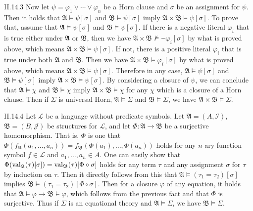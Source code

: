 \documentclass[12pt]{article}
\begin{document}
\begin{customthm}{II.14.3}
  Now let $\psi=\varphi_1\vee\cdots\vee\varphi_n$ be a Horn clause and $\sigma$ be an assignment for $\psi$. Then it holds that $\mathfrak{A}\models\psi[\sigma]$ and $\mathfrak{B}\models\psi[\sigma]$ imply $\mathfrak{A}\times\mathfrak{B}\models\psi[\sigma]$. To prove that, assume that $\mathfrak{A}\models\psi[\sigma]$ and $\mathfrak{B}\models\psi[\sigma]$. If there is a negative literal $\varphi_i$ that is true either under $\mathfrak{A}$ or $\mathfrak{B}$, then we have $\mathfrak{A}\times\mathfrak{B}\not\models\neg\varphi_i[\sigma]$ by what is proved above, which means $\mathfrak{A}\times\mathfrak{B}\models\psi[\sigma]$. If not, there is a positive literal $\varphi_i$ that is true under both $\mathfrak{A}$ and $\mathfrak{B}$. Then we have $\mathfrak{A}\times\mathfrak{B}\models\varphi_i[\sigma]$ by what is proved above, which means $\mathfrak{A}\times\mathfrak{B}\models\psi[\sigma]$. Therefore in any case, $\mathfrak{A}\models\psi[\sigma]$ and $\mathfrak{B}\models\psi[\sigma]$ imply $\mathfrak{A}\times\mathfrak{B}\models\psi[\sigma]$. By considering a closure of $\psi$, we can conclude that $\mathfrak{A}\models\chi$ and $\mathfrak{B}\models\chi$ imply $\mathfrak{A}\times\mathfrak{B}\models\chi$ for any $\chi$ which is a closure of a Horn clause. Then if $\Sigma$ is universal Horn, $\mathfrak{A}\models\Sigma$ and $\mathfrak{B}\models\Sigma$, we have $\mathfrak{A}\times\mathfrak{B}\models\Sigma$.
\end{customthm}

\begin{customthm}{II.14.4}
  Let $\mathcal{L}$ be a language without predicate symbols. Let $\mathfrak{A}=(A,\mathcal{I})$, $\mathfrak{B}=(B,\mathcal{J})$ be structures for $\mathcal{L}$, and let $\Phi:\mathfrak{A}\rightarrow\mathfrak{B}$ be a surjective homomorphism. That is, $\Phi$ is one that $\Phi(f_\mathfrak{A}(a_1,\ldots,a_n))=f_\mathfrak{B}(\Phi(a_1),\ldots,\Phi(a_n))$ holds for any $n$-ary function symbol $f\in\mathcal{L}$ and $a_1,\ldots,a_n\in A$. One can easily show that $\Phi(\mathop{\mathrm{val}}_\mathfrak{A}(\tau)[\sigma])=\mathop{\mathrm{val}}_\mathfrak{B}(\tau)[\Phi\circ\sigma]$ holds for any term $\tau$ and any assignment $\sigma$ for $\tau$ by induction on $\tau$. Then it directly follows from this that $\mathfrak{A}\models(\tau_1=\tau_2)[\sigma]$ implies $\mathfrak{B}\models(\tau_1=\tau_2)[\Phi\circ\sigma]$. Then for a closure $\varphi$ of any equation, it holds that $\mathfrak{A}\models\varphi\rightarrow\mathfrak{B}\models\varphi$, which follows from the previous fact and that $\Phi$ is surjective. Thus if $\Sigma$ is an equational theory and $\mathfrak{A}\models\Sigma$, we have $\mathfrak{B}\models\Sigma$.
\end{customthm}
\end{document}
